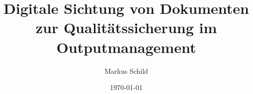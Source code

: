 \title{Digitale Sichtung von Dokumenten zur Qualitätssicherung im Outputmanagement}
\author{Markus Schild}
\date{\today}

\newcommand{\varMartrikelnummer}{5007626}
\newcommand{\varArbeit}{Bachelorarbeit}
\newcommand{\varStudiengang}{Wirtschaftsinformatik}
\newcommand{\varUnternehmen}{mediserv Bank GmbH}
\newcommand{\varBetrBetreuer}{Peter Auer}
\newcommand{\varASWGutachter}{Prof. Dr. Dieter Hofbauer}
\newcommand{\varEingereichtAm}{27. Juli 2025}